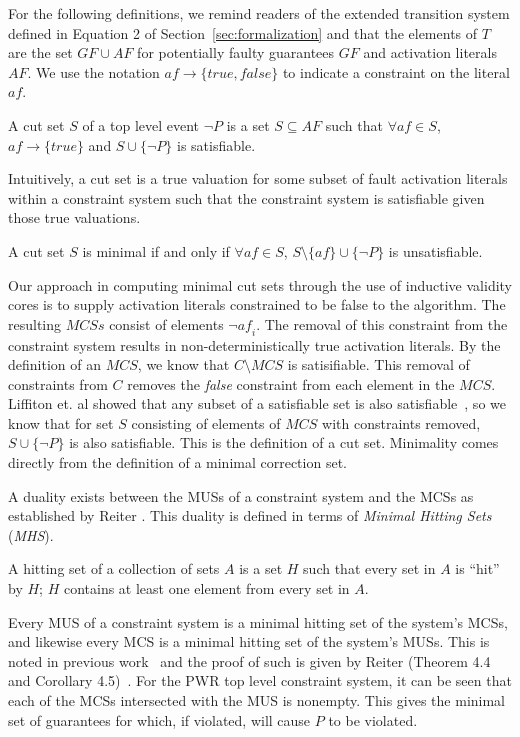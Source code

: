 For the following definitions, we remind readers of the extended transition system defined in Equation 2 of Section~\ref{sec:formalization} and that the elements of $T$ are the set $\mathit{GF} \cup \mathit{AF}$ for potentially faulty guarantees $\mathit{GF}$ and activation literals $\mathit{AF}$. We use the notation $\mathit{af} \rightarrow \{\mathit{true}, \mathit{false}\}$ to indicate a constraint on the literal $\mathit{af}$. 

\begin{definition}
A cut set $S$ of a top level event $\neg P$ is a set $S \subseteq \mathit{AF}$ such that $\forall \mathit{af} \in S$, $\mathit{af} \rightarrow \{\mathit{true}\}$ and $S \cup \{\neg P\}$ is satisfiable.
\end{definition}

Intuitively, a cut set is a true valuation for some subset of fault activation literals within a constraint system such that the constraint system is satisfiable given those true valuations.

\begin{definition}
A cut set $S$ is minimal if and only if $\forall \mathit{af} \in S$, $S \setminus \{\mathit{af}\} \cup \{\neg P\}$ is unsatisfiable.
\end{definition}

Our approach in computing minimal cut sets through the use of inductive validity cores is to supply activation literals constrained to be false to the algorithm. The resulting $\mathit{MCS}s$ consist of elements $\neg \mathit{af}_i$. The removal of this constraint from the constraint system results in non-deterministically true activation literals. By the definition of an $\mathit{MCS}$, we know that $C \setminus \mathit{MCS}$ is satisifiable. This removal of constraints from $C$ removes the {\em false} constraint from each element in the $\mathit{MCS}$. Liffiton et. al showed that any subset of a satisfiable set is also satisfiable~\cite{liffiton2016fast}, so we know that for set $S$ consisting of elements of $\mathit{MCS}$ with constraints removed, $S \cup \{\neg P\}$ is also satisfiable. This is the definition of a cut set. Minimality comes directly from the definition of a minimal correction set. 

A duality exists between the MUSs of a constraint system and the MCSs as established by Reiter \cite{reiter1987theory}. This duality is defined in terms of \textit{Minimal Hitting Sets} (\textit{MHS}). 
\begin{definition}
A hitting set of a collection of sets $A$ is a set $H$ such that every set in $A$ is ``hit'' by $H$; $H$ contains at least one element from every set in $A$. 
\end{definition}
Every MUS of a constraint system is a minimal hitting set of the system's MCSs, and likewise every MCS is a minimal hitting set of the system's MUSs. This is noted in previous work~\cite{liffiton2016fast, de1987diagnosing} and the proof of such is given by Reiter (Theorem 4.4 and Corollary 4.5)~\cite{reiter1987theory}. For the PWR top level constraint system, it can be seen that each of the MCSs intersected with the MUS is nonempty. This gives the minimal set of guarantees for which, if violated, will cause $P$ to be violated. 

